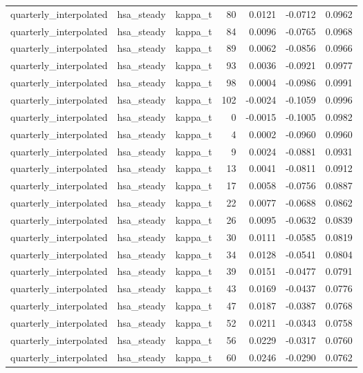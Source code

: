 \begin{tabular}{lllrrrr}
quarterly\_interpolated & hsa\_steady & kappa\_t & 80 & 0.0121 & -0.0712 & 0.0962 \\
quarterly\_interpolated & hsa\_steady & kappa\_t & 84 & 0.0096 & -0.0765 & 0.0968 \\
quarterly\_interpolated & hsa\_steady & kappa\_t & 89 & 0.0062 & -0.0856 & 0.0966 \\
quarterly\_interpolated & hsa\_steady & kappa\_t & 93 & 0.0036 & -0.0921 & 0.0977 \\
quarterly\_interpolated & hsa\_steady & kappa\_t & 98 & 0.0004 & -0.0986 & 0.0991 \\
quarterly\_interpolated & hsa\_steady & kappa\_t & 102 & -0.0024 & -0.1059 & 0.0996 \\
quarterly\_interpolated & hsa\_steady & kappa\_t & 0 & -0.0015 & -0.1005 & 0.0982 \\
quarterly\_interpolated & hsa\_steady & kappa\_t & 4 & 0.0002 & -0.0960 & 0.0960 \\
quarterly\_interpolated & hsa\_steady & kappa\_t & 9 & 0.0024 & -0.0881 & 0.0931 \\
quarterly\_interpolated & hsa\_steady & kappa\_t & 13 & 0.0041 & -0.0811 & 0.0912 \\
quarterly\_interpolated & hsa\_steady & kappa\_t & 17 & 0.0058 & -0.0756 & 0.0887 \\
quarterly\_interpolated & hsa\_steady & kappa\_t & 22 & 0.0077 & -0.0688 & 0.0862 \\
quarterly\_interpolated & hsa\_steady & kappa\_t & 26 & 0.0095 & -0.0632 & 0.0839 \\
quarterly\_interpolated & hsa\_steady & kappa\_t & 30 & 0.0111 & -0.0585 & 0.0819 \\
quarterly\_interpolated & hsa\_steady & kappa\_t & 34 & 0.0128 & -0.0541 & 0.0804 \\
quarterly\_interpolated & hsa\_steady & kappa\_t & 39 & 0.0151 & -0.0477 & 0.0791 \\
quarterly\_interpolated & hsa\_steady & kappa\_t & 43 & 0.0169 & -0.0437 & 0.0776 \\
quarterly\_interpolated & hsa\_steady & kappa\_t & 47 & 0.0187 & -0.0387 & 0.0768 \\
quarterly\_interpolated & hsa\_steady & kappa\_t & 52 & 0.0211 & -0.0343 & 0.0758 \\
quarterly\_interpolated & hsa\_steady & kappa\_t & 56 & 0.0229 & -0.0317 & 0.0760 \\
quarterly\_interpolated & hsa\_steady & kappa\_t & 60 & 0.0246 & -0.0290 & 0.0762 \\

\end{tabular}
